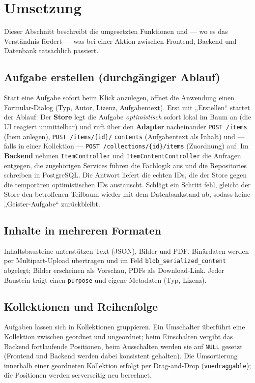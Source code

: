 \documentclass[11pt,a4paper]{article}
\begin{document}
\section{Umsetzung}\label{sec:umsetzung}

Dieser Abschnitt beschreibt die umgesetzten Funktionen und --- wo es das
Verständnis fördert --- was bei einer Aktion zwischen Frontend, Backend und
Datenbank tatsächlich passiert.

\subsection{Aufgabe erstellen (durchgängiger Ablauf)}
Statt eine Aufgabe sofort beim Klick anzulegen, öffnet die Anwendung einen
Formular-Dialog (Typ, Autor, Lizenz, Aufgabentext). Erst mit „Erstellen`` startet
der Ablauf: Der \textbf{Store} legt die Aufgabe \emph{optimistisch} sofort lokal
im Baum an (die UI reagiert unmittelbar) und ruft über den \textbf{Adapter}
nacheinander \texttt{POST /items} (Item anlegen), \texttt{POST /items/\{id\}/}
\texttt{contents} (Aufgabentext als Inhalt) und --- falls in einer Kollektion ---
\texttt{POST /collections/\{id\}/items} (Zuordnung) auf. Im \textbf{Backend}
nehmen \texttt{ItemController} und \texttt{ItemContentController} die Anfragen
entgegen, die zugehörigen Services führen die Fachlogik aus und die Repositories
schreiben in PostgreSQL. Die Antwort liefert die echten IDs, die der Store gegen
die temporären optimistischen IDs austauscht. Schlägt ein Schritt fehl, gleicht
der Store den betroffenen Teilbaum wieder mit dem Datenbankstand ab, sodass keine
„Geister-Aufgabe`` zurückbleibt.

\subsection{Inhalte in mehreren Formaten}
Inhaltsbausteine unterstützen Text (JSON), Bilder und PDF. Binärdaten werden per
Multipart-Upload übertragen und im Feld \texttt{blob\_serialized\_content}
abgelegt; Bilder erscheinen als Vorschau, PDFs als Download-Link. Jeder Baustein
trägt einen \texttt{purpose} und eigene Metadaten (Typ, Lizenz).

\subsection{Kollektionen und Reihenfolge}
Aufgaben lassen sich in Kollektionen gruppieren. Ein Umschalter überführt eine
Kollektion zwischen geordnet und ungeordnet; beim Einschalten vergibt das Backend
fortlaufende Positionen, beim Ausschalten werden sie auf \texttt{NULL} gesetzt
(Frontend und Backend werden dabei konsistent gehalten). Die Umsortierung
innerhalb einer geordneten Kollektion erfolgt per Drag-and-Drop
(\texttt{vuedraggable}); die Positionen werden serverseitig neu berechnet.
\end{document}
